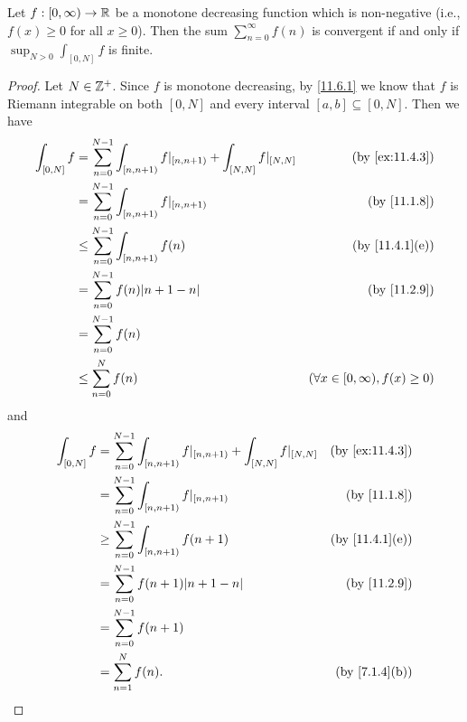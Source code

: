 \begin{prop}\label{11.6.4}
  Let \(f : [0, \infty) \to \mathbb{R}\) be a monotone decreasing function which is non-negative
  (i.e., \(f(x) \geq 0\) for all \(x \geq 0\)).
  Then the sum \(\sum_{n = 0}^\infty f(n)\) is convergent if and only if \(\sup_{N > 0} \int_{[0, N]} f\) is finite.
\end{prop}

\begin{proof}
  Let \(N \in \mathbb{Z}^+\).
  Since \(f\) is monotone decreasing, by \cref{11.6.1} we know that \(f\) is Riemann integrable on both \([0, N]\) and every interval \([a, b] \subseteq [0, N]\).
  Then we have
  \begin{align*}
    \int_{[0, N]} f & = \sum_{n = 0}^{N - 1} \int_{[n, n + 1)} f|_{[n, n + 1)} + \int_{[N, N]} f|_{[N, N]} & \text{(by \cref{ex:11.4.3})}             \\
                    & = \sum_{n = 0}^{N - 1} \int_{[n, n + 1)} f|_{[n, n + 1)}                             & \text{(by \cref{11.1.8})}                \\
                    & \leq \sum_{n = 0}^{N - 1} \int_{[n, n + 1)} f(n)                                     & \text{(by \cref{11.4.1}(e))}             \\
                    & = \sum_{n = 0}^{N - 1} f(n) \abs{n + 1 - n}                                          & \text{(by \cref{11.2.9})}                \\
                    & = \sum_{n = 0}^{N - 1} f(n)                                                                                                     \\
                    & \leq \sum_{n = 0}^N f(n)                                                             & (\forall x \in [0, \infty), f(x) \geq 0)
  \end{align*}
  and
  \begin{align*}
    \int_{[0, N]} f & = \sum_{n = 0}^{N - 1} \int_{[n, n + 1)} f|_{[n, n + 1)} + \int_{[N, N]} f|_{[N, N]} & \text{(by \cref{ex:11.4.3})} \\
                    & = \sum_{n = 0}^{N - 1} \int_{[n, n + 1)} f|_{[n, n + 1)}                             & \text{(by \cref{11.1.8})}    \\
                    & \geq \sum_{n = 0}^{N - 1} \int_{[n, n + 1)} f(n + 1)                                 & \text{(by \cref{11.4.1}(e))} \\
                    & = \sum_{n = 0}^{N - 1} f(n + 1) \abs{n + 1 - n}                                      & \text{(by \cref{11.2.9})}    \\
                    & = \sum_{n = 0}^{N - 1} f(n + 1)                                                                                     \\
                    & = \sum_{n = 1}^N f(n).                                                               & \text{(by \cref{7.1.4}(b))}
  \end{align*}


\end{proof}
